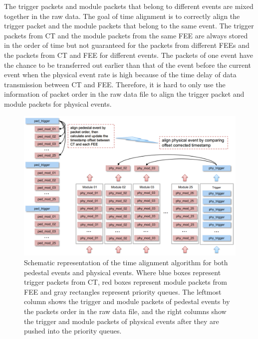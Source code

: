 \documentclass{raa}
\begin{document}
The trigger packets and module packets that belong to different events are mixed together in the raw data. The goal of time alignment is to correctly align the trigger packet and the module packets that belong to the same event. The trigger packets from CT and the module packets from the same FEE are always stored in the order of time but not guaranteed for the packets from different FEEs and the packets from CT and FEE for different events. The packets of one event have the chance to be transferred out earlier than that of the event before the current event when the physical event rate is high because of the time delay of data transmission between CT and FEE. Therefore, it is hard to only use the information of packet order in the raw data file to align the trigger packet and module packets for physical events.

\begin{figure}[!ht]
\centering
\includegraphics[width=14cm]{images/time_alignment_method.png}
\caption{Schematic representation of the time alignment algorithm for both pedestal events and physical events. Where blue boxes represent trigger packets from CT, red boxes represent module packets from FEE and gray rectangles represent priority queues. The leftmost column shows the trigger and module packets of pedestal events by the packets order in the raw data file, and the right columns show the trigger and module packets of physical events after they are pushed into the priority queues.}
\label{fig:time_align}
\end{figure}
\end{document}
